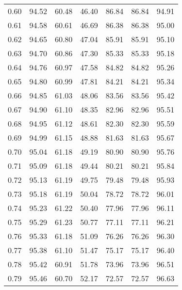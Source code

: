 \begin{tabular}{|c|c|c|c|c|c|c|}
      0.60 &     94.52 &     60.48 &      46.40 &   86.84 &      86.84 &         94.91 \\
      0.61 &     94.58 &     60.61 &      46.69 &   86.38 &      86.38 &         95.00 \\
      0.62 &     94.65 &     60.80 &      47.04 &   85.91 &      85.91 &         95.10 \\
      0.63 &     94.70 &     60.86 &      47.30 &   85.33 &      85.33 &         95.18 \\
      0.64 &     94.76 &     60.97 &      47.58 &   84.82 &      84.82 &         95.26 \\
      0.65 &     94.80 &     60.99 &      47.81 &   84.21 &      84.21 &         95.34 \\
      0.66 &     94.85 &     61.03 &      48.06 &   83.56 &      83.56 &         95.42 \\
      0.67 &     94.90 &     61.10 &      48.35 &   82.96 &      82.96 &         95.51 \\
      0.68 &     94.95 &     61.12 &      48.61 &   82.30 &      82.30 &         95.59 \\
      0.69 &     94.99 &     61.15 &      48.88 &   81.63 &      81.63 &         95.67 \\
      0.70 &     95.04 &     61.18 &      49.19 &   80.90 &      80.90 &         95.76 \\
      0.71 &     95.09 &     61.18 &      49.44 &   80.21 &      80.21 &         95.84 \\
      0.72 &     95.13 &     61.19 &      49.75 &   79.48 &      79.48 &         95.93 \\
      0.73 &     95.18 &     61.19 &      50.04 &   78.72 &      78.72 &         96.01 \\
      0.74 &     95.23 &     61.22 &      50.40 &   77.96 &      77.96 &         96.11 \\
      0.75 &     95.29 &     61.23 &      50.77 &   77.11 &      77.11 &         96.21 \\
      0.76 &     95.33 &     61.18 &      51.09 &   76.26 &      76.26 &         96.30 \\
      0.77 &     95.38 &     61.10 &      51.47 &   75.17 &      75.17 &         96.40 \\
      0.78 &     95.42 &     60.91 &      51.78 &   73.96 &      73.96 &         96.51 \\
      0.79 &     95.46 &     60.70 &      52.17 &   72.57 &      72.57 &         96.63 \\

\end{tabular}
